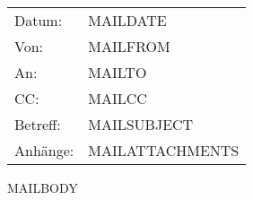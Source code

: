 ﻿\documentclass{scrartcl}
\begin{document}
\begin{tabular}{ @{} p{} p{} @{} }
Datum:      & MAILDATE \\
Von:        & MAILFROM \\
An:         & MAILTO \\
CC:         & MAILCC \\
Betreff:    & MAILSUBJECT \\
Anhänge:    & MAILATTACHMENTS \\
\end{tabular}

\vspace{0.5cm}
MAILBODY
\end{document}
